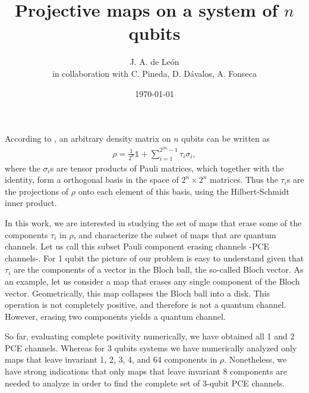 \documentclass[11pt,dvipsnames]{article} %
\newcommand{\pce}{PCE}
\newcommand{\1}{\mathds{1}}
\begin{document}
\title{Projective maps on a system of $n$ qubits} 
\author{J. A. de León\\ \small{in collaboration with C. Pineda, D. Dávalos, A. Fonseca}}
\date{\today}  
\maketitle
According to \cite{bengtsson_zyczkowski_2017}, an arbitrary density matrix on $n$  
qubits can be written as
\begin{align}
  \rho = \frac{1}{2^n}\1 + \sum _{i=1}^{2^{2n}-1}\tau _i\sigma _i,
	\label{rho}
\end{align}
where the $\sigma _i$s are tensor products of Pauli 
matrices, which together with the identity, form a orthogonal basis in the space of
$2^n\times 2^n$ matrices. Thus the $\tau_i$s are the projections of $\rho$ onto
each element of this basis, using the Hilbert-Schmidt inner product.

In this work, we are interested in studying the set of maps that erase
some of the components $\tau_i$ in $\rho$, and characterize the subset of maps
that are quantum channels.
Let us call this subset Pauli component erasing
channels -\pce{} channels-.
For 1 qubit the picture of our problem is easy to understand given that 
$\tau_i$ are the components of a vector in the Bloch ball, the so-called
Bloch vector. As an example, let us consider a map that erases any single
component of the Bloch vector. Geometrically, this map collapses 
the Bloch ball into a disk. This operation is not completely positive, and
therefore is not a quantum channel.  However, erasing two components yields 
a quantum channel.

So far, evaluating complete positivity numerically, we have obtained all 1 and
2 \pce{} channels. Whereas for $3$ qubits systems we have numerically analyzed
only maps that leave invariant 1, 2, 3, 4, and 64 components in $\rho$.
Nonetheless, we have strong indications that only maps that leave invariant 8
components are needed to analyze in order to find the complete set of 3-qubit
PCE channels.
\end{document}
